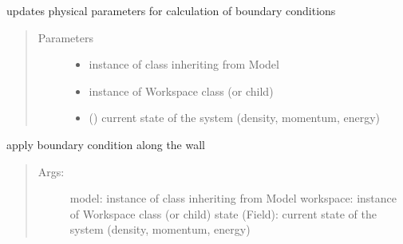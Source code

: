 \documentclass[letterpaper,10pt,english]{sphinxmanual}
\begin{document}
\begin{fulllineitems}

\begin{fulllineitems}
\label{\detokenize{autoapi/BoundaryConditioner/index:BoundaryConditioner.BoundaryConditioner.update_physics}}
\sphinxAtStartPar
updates physical parameters for calculation of boundary conditions
\begin{quote}\begin{description}
\item[{Parameters}] \leavevmode\begin{itemize}
\item {} 
\sphinxAtStartPar
{} \textendash{} instance of class inheriting from Model

\item {} 
\sphinxAtStartPar
{} \textendash{} instance of Workspace class (or child)

\item {} 
\sphinxAtStartPar
{} ({\hyperref[\detokenize{autoapi/Field/index:Field.Field}]{}}) \textendash{} current state of the system (density, momentum, energy)

\end{itemize}

\end{description}\end{quote}

\end{fulllineitems}


\begin{fulllineitems}
\label{\detokenize{autoapi/BoundaryConditioner/index:BoundaryConditioner.BoundaryConditioner.bc_wall}}
\sphinxAtStartPar
apply boundary condition along the wall
\begin{quote}
\begin{description}
\item[{Args:}] \leavevmode
\sphinxAtStartPar
model: instance of class inheriting from Model
workspace: instance of Workspace class (or child)
state (Field): current state of the system (density, momentum, energy)


\end{description}
\end{quote}
\end{fulllineitems}
\end{fulllineitems}
\end{document}
